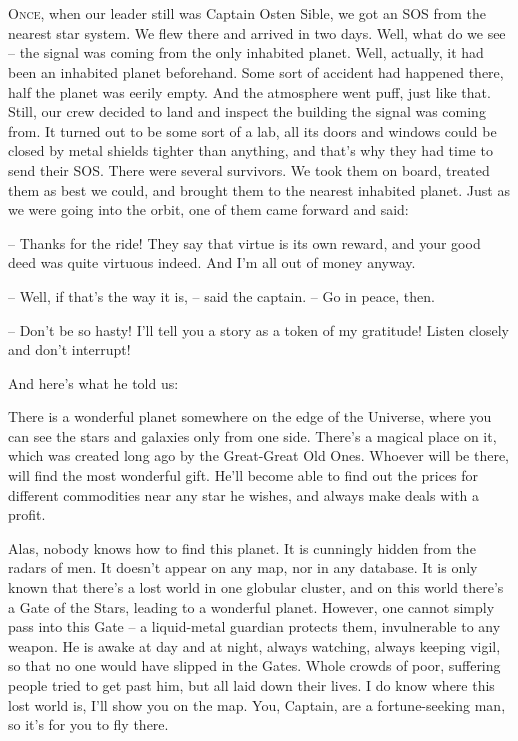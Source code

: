 \documentclass[ebook,oneside,final,openright]{memoir}
\begin{document}
\chapter{}
\par
\lettrine{O}{nce,} when our leader still was Captain Osten Sible, we got an SOS from the nearest star system. We flew there and arrived in two days. Well, what do we see – the signal was coming from the only inhabited planet. Well, actually, it had been an inhabited planet beforehand. Some sort of accident had happened there, half the planet was eerily empty. And the atmosphere went puff, just like that. Still, our crew decided to land and inspect the building the signal was coming from. It turned out to be some sort of a lab, all its doors and windows could be closed by metal shields tighter than anything, and that’s why they had time to send their SOS. There were several survivors. We took them on board, treated them as best we could, and brought them to the nearest inhabited planet. Just as we were going into the orbit, one of them came forward and said: \par
\par
– Thanks for the ride! They say that virtue is its own reward, and your good deed was quite virtuous indeed. And I’m all out of money anyway.\par
– Well, if that’s the way it is, – said the captain. – Go in peace, then. \par
– Don’t be so hasty! I’ll tell you a story as a token of my gratitude! Listen closely and don’t interrupt! \par
 And here’s what he told us:\par
\par
 There is a wonderful planet somewhere on the edge of the Universe, where you can see the stars and galaxies only from one side. There’s a magical place on it, which was created long ago by the Great-Great Old Ones. Whoever will be there, will find the most wonderful gift. He’ll become able to find out the prices for different commodities near any star he wishes, and always make deals with a profit. \par
Alas, nobody knows how to find this planet. It is cunningly hidden from the radars of men. It doesn’t appear on any map, nor in any database. It is only known that there’s a lost world in one globular cluster, and on this world there’s a Gate of the Stars, leading to a wonderful planet. However, one cannot simply pass into this Gate – a liquid-metal guardian protects them, invulnerable to any weapon. He is awake at day and at night, always watching, always keeping vigil, so that no one would have slipped in the Gates. Whole crowds of poor, suffering people tried to get past him, but all laid down their lives. I do know where this lost world is, I’ll show you on the map. You, Captain, are a fortune-seeking man, so it’s for you to fly there.\par
\end{document}
